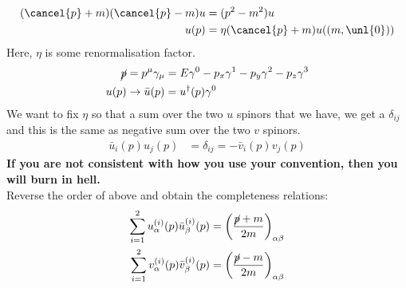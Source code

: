\documentclass[a4paper, 11pt, normalem]{report}
\begin{document}
\begin{align}
    (\cancel{p}+m)(\cancel{p}-m)u &= (p^2-m^2)u \\
    u(p) &= \eta(\cancel{p}+m)u((m,\unl{0}))
\end{align}
Here, $\eta$ is some renormalisation factor. 
\begin{align}
    \cancel{p} &= p^\mu\gamma_\mu = E\gamma^0 - p_x\gamma^1 - p_y\gamma^2 - p_z\gamma^3 \\
    u(p) &\to \bar{u}(p) = u^\dagger(p)\gamma^0
\end{align}
We want to fix $\eta$ so that a sum over the two $u$ spinors that we have, we get a $\delta_{ij}$ and this is the same as negative sum over the two $v$ spinors.
\begin{align}
    \bar{u}_i(p)u_j(p) &= \delta_{ij} = -\bar{v}_i(p)v_j(p)
\end{align}
\textbf{If you are not consistent with how you use your convention, then you will burn in hell.}\\
Reverse the order of above and obtain the completeness relations:
\begin{align}
    \sum_{i=1}^2 u^{(i)}_\alpha(p)\bar{u}^{(i)}_\beta(p) &= \left(\frac{\cancel{p}+m}{2m}\right)_{\alpha\beta} \\
    \sum_{i=1}^2 v_\alpha^{(i)}(p)\bar{v}_\beta^{(i)}(p) &= \left(\frac{\cancel{p}-m}{2m}\right)_{\alpha\beta}
\end{align}
\end{document}
